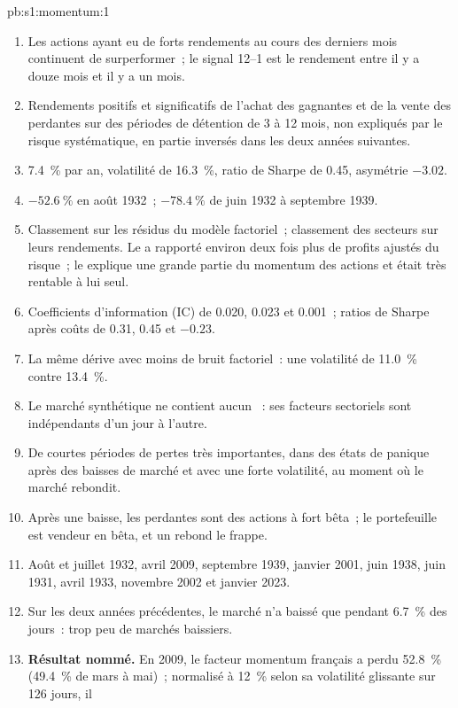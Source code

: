 \begin{solution}{pb:s1:momentum:1}
\begin{enumerate}
\item Les actions ayant eu de forts rendements au cours des derniers mois continuent de surperformer~; le signal 12--1 est le rendement entre il y a douze mois et il y a un mois.
\item Rendements positifs et significatifs de l'achat des gagnantes et de la vente des perdantes sur des périodes de détention de 3 à 12 mois, non expliqués par le risque systématique, en partie
inversés dans les deux années suivantes.
\item 7.4~\% par an, volatilité de 16.3~\%, ratio de Sharpe de 0.45, asymétrie $-3.02$.
\item $-52.6~\%$ en août 1932~; $-78.4~\%$ de juin 1932 à septembre 1939.
\item Classement sur les résidus du modèle factoriel~; classement des secteurs sur leurs rendements. Le  a rapporté environ deux fois plus de profits ajustés du risque~; le 
explique une grande partie du momentum des actions et était très rentable à lui seul.
\item Coefficients d'information (IC) de 0.020, 0.023 et 0.001~; ratios de Sharpe après coûts de 0.31, 0.45 et $-0.23$.
\item La même dérive avec moins de bruit factoriel~: une volatilité de 11.0~\% contre 13.4~\%.
\item Le marché synthétique ne contient aucun ~: ses facteurs sectoriels sont indépendants d'un jour à l'autre.
\item De courtes périodes de pertes très importantes, dans des états de panique après des baisses de marché et avec une forte volatilité, au moment où le marché rebondit.
\item Après une baisse, les perdantes sont des actions à fort bêta~; le portefeuille est vendeur en bêta, et un rebond le frappe.
\item Août et juillet 1932, avril 2009, septembre 1939, janvier 2001, juin 1938, juin 1931, avril 1933, novembre 2002 et janvier 2023.
\item Sur les deux années précédentes, le marché n'a baissé que pendant 6.7~\% des jours~: trop peu de marchés baissiers.
\item \textbf{Résultat nommé.} En 2009, le facteur momentum français a perdu 52.8~\% (49.4~\% de mars à mai)~; normalisé à 12~\% selon sa volatilité glissante sur 126 jours, il

\end{enumerate}
\end{solution}
